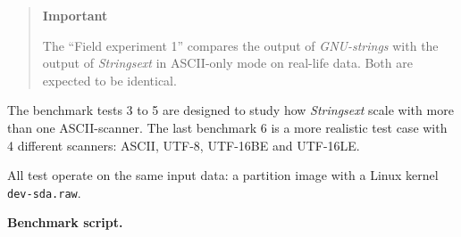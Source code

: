 \begin{quote}
\textbf{Important}

The ``Field experiment 1'' compares the output of \emph{GNU-strings}
with the output of \emph{Strings­ext} in ASCII-only mode on real-life
data. Both are expected to be identical.
\end{quote}

The benchmark tests 3 to 5 are designed to study how \emph{Strings­ext}
scale with more than one ASCII-scanner. The last benchmark 6 is a more
realistic test case with 4 different scanners: ASCII, UTF-8, UTF-16BE
and UTF-16LE.

All test operate on the same input data: a partition image with a Linux
kernel \texttt{dev-sda.raw}.

\textbf{Benchmark script.}

\begin{Shaded}
\begin{Highlighting}[]

 \VariableTok{$(} \VariableTok{)} \OperatorTok{>>}
 \VariableTok{$(}  \OperatorTok{>>}

  \OperatorTok{>>}
   \NormalTok{\textbackslash{}}
    \OperatorTok{>} 

  \OperatorTok{>>}
   \NormalTok{\textbackslash{}}
    \OperatorTok{>} 


\end{Highlighting}
\end{Shaded}
